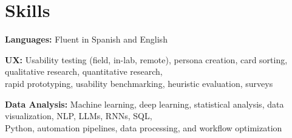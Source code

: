 \documentclass[letterpaper,11pt]{article}
\newcommand{\resumeSubHeadingListStart}{\begin{itemize}[leftmargin=0.15in, label={}]}
\newcommand{\resumeSubHeadingListEnd}{\end{itemize}}
\begin{document}
\section{Skills}
  \vspace{2pt}
  \resumeSubHeadingListStart
    \small{\item{
        
        \textbf{Languages:}{ Fluent in Spanish and English} \\ \vspace{3pt}
        
        \textbf{UX:}{ Usability testing (field, in-lab, remote), persona creation, card sorting, qualitative research, quantitative research, \\ \hspace{23pt} rapid prototyping, usability benchmarking, heuristic evaluation, surveys} \\ \vspace{3pt}
        
        \textbf{Data Analysis:}{ Machine learning, deep learning, statistical analysis, data visualization, NLP, LLMs, RNNs, SQL, \\ \hspace{25pt} Python, automation pipelines, data processing, and workflow optimization} \\ \vspace{3pt}
        
    }}
  \resumeSubHeadingListEnd

\end{document}
